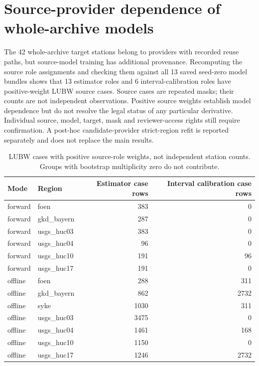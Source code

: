 \section{Source-provider dependence of whole-archive models}
The 42 whole-archive target stations belong to providers with recorded reuse paths, but source-model training has additional provenance. Recomputing the source role assignments and checking them against all 13 saved seed-zero model bundles shows that 13 estimator roles and 6 interval-calibration roles have positive-weight LUBW source cases. Source cases are repeated masks; their counts are not independent observations. Positive source weights establish model dependence but do not resolve the legal status of any particular derivative. Individual source, model, target, mask and reviewer-access rights still require confirmation. A post-hoc candidate-provider strict-region refit is reported separately and does not replace the main results.
\begin{table}[p]\centering\small
\caption{LUBW cases with positive source-role weights, not independent station counts. Groups with bootstrap multiplicity zero do not contribute.}\label{tab:rights-roles}
\begin{tabular}{llrr}\toprule
Mode & Region & Estimator case rows & Interval calibration case rows\\\midrule
forward & foen & 383 & 0\\
forward & gkd\_bayern & 287 & 0\\
forward & usgs\_huc03 & 383 & 0\\
forward & usgs\_huc04 & 96 & 0\\
forward & usgs\_huc10 & 191 & 96\\
forward & usgs\_huc17 & 191 & 0\\
offline & foen & 288 & 311\\
offline & gkd\_bayern & 862 & 2732\\
offline & syke & 1030 & 311\\
offline & usgs\_huc03 & 3475 & 0\\
offline & usgs\_huc04 & 1461 & 168\\
offline & usgs\_huc10 & 1150 & 0\\
offline & usgs\_huc17 & 1246 & 2732\\
\bottomrule\end{tabular}
\end{table}
